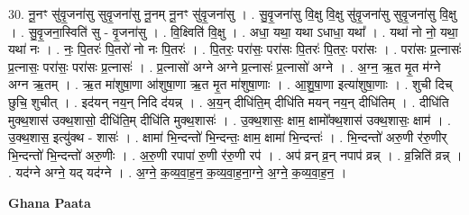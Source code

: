 \documentclass[17pt]{extarticle}
\begin{document}
30. नू॒नꣳ सु॑वृ॒जना॑सु सुवृ॒जना॑सु नू॒नम् नू॒नꣳ सु॑वृ॒जना॑सु । . सु॒वृ॒जना॑सु वि॒क्षु वि॒क्षु सु॑वृ॒जना॑सु सुवृ॒जना॑सु वि॒क्षु । . सु॒वृ॒जना॒स्विति॑ सु - वृ॒जना॑सु । . वि॒क्ष्विति॑ वि॒क्षु । . अधा॒ यथा॒ यथा ऽधाधा॒ यथा᳚ । . यथा॑ नो नो॒ यथा॒ यथा॑ नः । . नः॒ पि॒तरः॑ पि॒तरो॑ नो नः पि॒तरः॑ । . पि॒तरः॒ परा॑सः॒ परा॑सः पि॒तरः॑ पि॒तरः॒ परा॑सः । . परा॑सः प्र॒त्नासः॑ प्र॒त्नासः॒ परा॑सः॒ परा॑सः प्र॒त्नासः॑ । . प्र॒त्नासो॑ अग्ने अग्ने प्र॒त्नासः॑ प्र॒त्नासो॑ अग्ने । . अ॒ग्न॒ ऋ॒त मृ॒त म॑ग्ने अग्न ऋ॒तम् । . ऋ॒त मा॑शुषा॒णा आ॑शुषा॒णा ऋ॒त मृ॒त मा॑शुषा॒णाः । . आ॒शु॒षा॒णा इत्या॑शुषा॒णाः । . शुची दिच् छुचि॒ शुचीत् । . इद॑यन् नय॒न् निदि द॑यन्न् । . अ॒य॒न् दीधि॑ति॒म् दीधि॑ति मयन् नय॒न् दीधि॑तिम् । . दीधि॑ति मुक्थ॒शास॑ उक्थ॒शासो॒ दीधि॑ति॒म् दीधि॑ति मुक्थ॒शासः॑ । . उ॒क्थ॒शासः॒ क्षाम॒ क्षामो᳚क्थ॒शास॑ उक्थ॒शासः॒ क्षाम॑ । . उ॒क्थ॒शास॒ इत्यु॑क्थ - शासः॑ । . क्षामा॑ भि॒न्दन्तो॑ भि॒न्दन्तः॒ क्षाम॒ क्षामा॑ भि॒न्दन्तः॑ । . भि॒न्दन्तो॑ अरु॒णी र॑रु॒णीर् भि॒न्दन्तो॑ भि॒न्दन्तो॑ अरु॒णीः । . अ॒रु॒णी रपापा॑ रु॒णी र॑रु॒णी रप॑ । . अप॑ व्रन् व्र॒न् नपाप॑ व्रन्न् । . व्र॒न्निति॑ व्रन्न् । . यद॑ग्ने अग्ने॒ यद् यद॑ग्ने । . अ॒ग्ने॒ क॒व्य॒वा॒ह॒न॒ क॒व्य॒वा॒ह॒ना॒ग्ने॒ अ॒ग्ने॒ क॒व्य॒वा॒ह॒न॒ । \newline

\textbf{Ghana Paata } \newline
\end{document}
